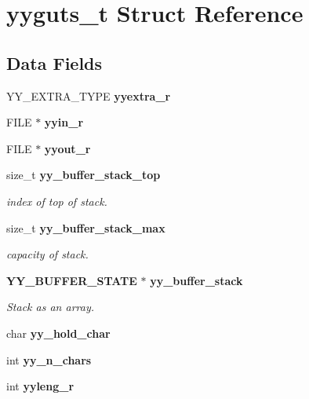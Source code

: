 \section{yyguts\-\_\-t \-Struct \-Reference}
\label{structyyguts__t}
\subsection*{\-Data \-Fields}
\begin{DoxyCompactItemize}
\item 
\-Y\-Y\-\_\-\-E\-X\-T\-R\-A\-\_\-\-T\-Y\-P\-E {\bfseries yyextra\-\_\-r}\label{structyyguts__t_aef05c0d6725a5214f6b30466f0b01c47}

\item 
\-F\-I\-L\-E $\ast$ {\bfseries yyin\-\_\-r}\label{structyyguts__t_a21f81ca100b12364a5095a37d1c6f650}

\item 
\-F\-I\-L\-E $\ast$ {\bfseries yyout\-\_\-r}\label{structyyguts__t_a436368a905aaf12e809e265749c74031}

\item 
size\-\_\-t {\bf yy\-\_\-buffer\-\_\-stack\-\_\-top}
\begin{DoxyCompactList}\small\item\em index of top of stack. \end{DoxyCompactList}\item 
size\-\_\-t {\bf yy\-\_\-buffer\-\_\-stack\-\_\-max}
\begin{DoxyCompactList}\small\item\em capacity of stack. \end{DoxyCompactList}\item 
{\bf \-Y\-Y\-\_\-\-B\-U\-F\-F\-E\-R\-\_\-\-S\-T\-A\-T\-E} $\ast$ {\bf yy\-\_\-buffer\-\_\-stack}
\begin{DoxyCompactList}\small\item\em \-Stack as an array. \end{DoxyCompactList}\item 
char {\bfseries yy\-\_\-hold\-\_\-char}\label{structyyguts__t_adde3f71374c223bbac47284824996e86}

\item 
int {\bfseries yy\-\_\-n\-\_\-chars}\label{structyyguts__t_a99c9218941829a6662d358422fd4184a}

\item 
int {\bfseries yyleng\-\_\-r}\label{structyyguts__t_aba739bc731f0e9cbb0b6bdfca7930ebd}


\end{DoxyCompactItemize}
